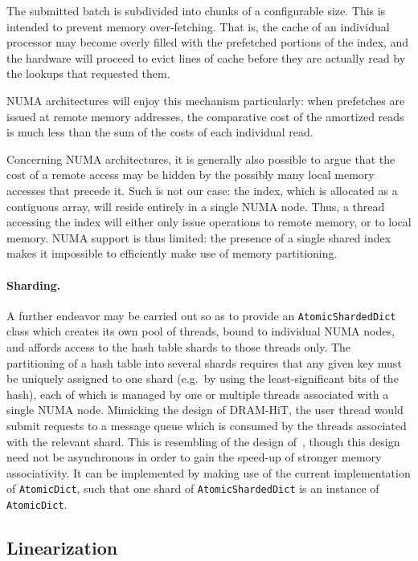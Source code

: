 The submitted batch is subdivided into chunks of a configurable size.
This is intended to prevent memory over-fetching.
That is, the cache of an individual processor may become overly filled with the prefetched portions of the index, and the hardware will proceed to evict lines of cache before they are actually read by the lookups that requested them.

NUMA architectures will enjoy this mechanism particularly: when prefetches are issued at remote memory addresses, the comparative cost of the amortized reads is much less than the sum of the costs of each individual read.

Concerning NUMA architectures, it is generally also possible to argue that the cost of a remote access may be hidden by the possibly many local memory accesses that precede it.
Such is not our case: the index, which is allocated as a contiguous array, will reside entirely in a single NUMA node.
Thus, a thread accessing the index will either only issue operations to remote memory, or to local memory.
NUMA support is thus limited: the presence of a single shared index makes it impossible to efficiently make use of memory partitioning.

\paragraph{Sharding.}
A further endeavor may be carried out so as to provide an \texttt{Atomic\-ShardedDict} class which creates its own pool of threads, bound to individual NUMA nodes, and affords access to the hash table shards to those threads only.
The partitioning of a hash table into several shards requires that any given key must be uniquely assigned to one shard (e.g.\ by using the least-significant bits of the hash), each of which is managed by one or multiple threads associated with a single NUMA node.
Mimicking the design of DRAM-HiT, the user thread would submit requests to a message queue which is consumed by the threads associated with the relevant shard.
This is resembling of the design of~\cite{dramhit}, though this design need not be asynchronous in order to gain the speed-up of stronger memory associativity.
It can be implemented by making use of the current implementation of \texttt{AtomicDict}, such that one shard of \texttt{AtomicShardedDict} is an instance of \texttt{AtomicDict}.

\subsection{Linearization}\label{subsec:batch-lookup-linearization}

